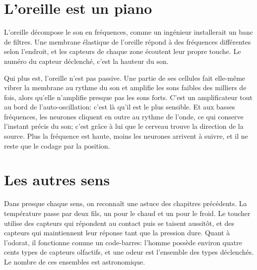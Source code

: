 \section*{L'oreille est un piano}

L'oreille décompose le son en fréquences, comme un ingénieur installerait un banc de filtres. Une membrane élastique de l'oreille répond à des fréquences différentes selon l'endroit, et les capteurs de chaque zone écoutent leur propre \og touche\fg{}. Le numéro du capteur déclenché, c'est la hauteur du son.


Qui plus est, l'oreille n'est pas passive. Une partie de ses cellules fait elle-même vibrer la membrane au rythme du son et amplifie les sons faibles des milliers de fois, alors qu'elle n'amplifie presque pas les sons forts. C'est un amplificateur tout au bord de l'auto-oscillation: c'est là qu'il est le plus sensible. Et aux basses fréquences, les neurones cliquent en outre au rythme de l'onde, ce qui conserve l'instant précis du son; c'est grâce à lui que le cerveau trouve la direction de la source. Plus la fréquence est haute, moins les neurones arrivent à suivre, et il ne reste que le codage par la position.

\section*{Les autres sens}

Dans presque chaque sens, on reconnaît une astuce des chapitres précédents. La température passe par deux fils, un pour le chaud et un pour le froid. Le toucher utilise des capteurs qui répondent au contact puis se taisent aussitôt, et des capteurs qui maintiennent leur réponse tant que la pression dure. Quant à l'odorat, il fonctionne comme un code-barres: l'homme possède environ quatre cents types de capteurs olfactifs, et une odeur est l'ensemble des types déclenchés. Le nombre de ces ensembles est astronomique.

